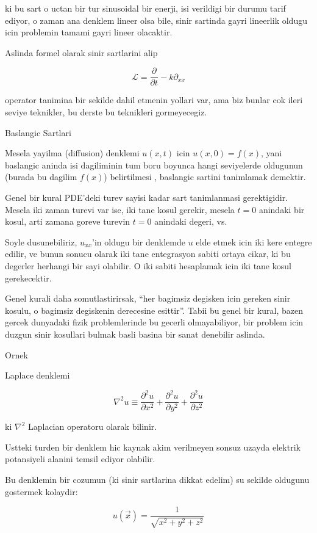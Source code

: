 \documentclass[12pt,fleqn]{article}\usepackage{../common}
\begin{document}
ki bu sart o uctan bir tur sinusoidal bir enerji, isi verildigi bir durumu
tarif ediyor, o zaman ana denklem lineer olsa bile, sinir sartinda gayri
lineerlik oldugu icin problemin tamami gayri lineer olacaktir. 

Aslinda formel olarak sinir sartlarini alip 

\[ \mathcal{L}  = \frac{\partial }{\partial t} - k \partial_{xx}\]

operator tanimina bir sekilde dahil etmenin yollari var, ama biz bunlar cok
ileri seviye teknikler, bu derste bu teknikleri gormeyecegiz. 

Baslangic Sartlari

Mesela yayilma (diffusion) denklemi $u(x,t)$ icin $u(x,0) = f(x)$, yani
baslangic aninda isi dagiliminin tum boru boyunca hangi seviyelerde
oldugunun (burada bu dagilim $f(x)$) belirtilmesi , baslangic sartini
tanimlamak demektir.

Genel bir kural PDE'deki turev sayisi kadar sart tanimlanmasi
gerektigidir. Mesela iki zaman turevi var ise, iki tane kosul gerekir,
mesela $t=0$ anindaki bir kosul, arti zamana goreve turevin $t=0$ anindaki
degeri, vs. 

Soyle dusunebiliriz, $u_{xx}$'in oldugu bir denklemde $u$ elde etmek icin
iki kere entegre edilir, ve bunun sonucu olarak iki tane entegrasyon sabiti
ortaya cikar, ki bu degerler herhangi bir sayi olabilir. O iki sabiti
hesaplamak icin iki tane kosul gerekecektir. 

Genel kurali daha somutlastirirsak, ``her bagimsiz degisken icin gereken
sinir kosulu, o bagimsiz degiskenin derecesine esittir''. Tabii bu genel
bir kural, bazen gercek dunyadaki fizik problemlerinde bu gecerli
olmayabiliyor, bir problem icin duzgun sinir kosullari bulmak basli basina
bir sanat denebilir aslinda. 

Ornek

Laplace denklemi

\[ \nabla^2 u \equiv \frac{\partial ^2u}{\partial x^2} + 
\frac{\partial ^2u}{\partial y^2}  +
\frac{\partial ^2u}{\partial z^2} 
\]

ki $\nabla^2$ Laplacian operatoru olarak bilinir. 

Ustteki turden bir denklem hic kaynak akim verilmeyen sonsuz uzayda
elektrik potansiyeli alanini temsil ediyor olabilir. 

Bu denklemin bir cozumun (ki sinir sartlarina dikkat edelim) su sekilde
oldugunu gostermek kolaydir:

\[ u(\vec{x}) = \frac{1}{\sqrt{x^2+y^2+z^2}} \]
\end{document}
